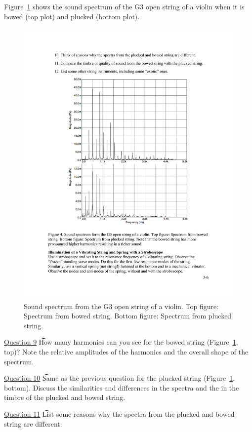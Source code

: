 \documentclass[11pt]{NSF}
\begin{document}
Figure~\ref{f:4} shows the sound  spectrum of the G3 open string of a violin
when it is bowed (top plot) and plucked (bottom plot). \\
%
\begin{figure}[hbtp] 
\begin{center} 
\includegraphics[width=.7\textwidth]{fig3_4}
\caption{Sound spectrum from the G3 open string of a violin. 
Top figure: Spectrum from bowed string. 
Bottom figure: Spectrum from plucked string.}
\label{f:4} 
\end{center} 
\end{figure}
%

\underline{Question 9} \t How many harmonics can you see for the bowed string (Figure~\ref{f:4}, top)? 
Note the relative amplitudes of the harmonics and the 
overall shape of the spectrum.

\underline{Question 10} \t  Same as the previous question for the plucked string (Figure~\ref{f:4}, bottom).
Discuss the similarities and differences in the spectra and the in the timbre of the plucked and bowed string. 

\underline{Question 11} \t  List some reasons why the spectra from the plucked and bowed string are different.
\end{document}

